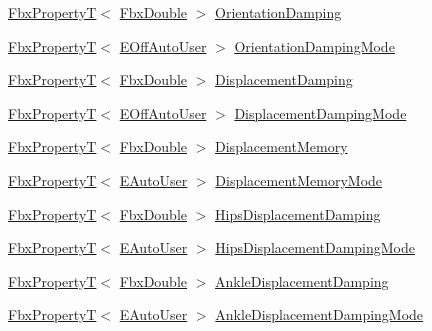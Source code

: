 \begin{DoxyCompactItemize}
\item 
\hyperlink{class_fbx_property_t}{Fbx\+PropertyT}$<$ \hyperlink{fbxtypes_8h_a171e72a1c46fc15c1a6c9c31948c1c5b}{Fbx\+Double} $>$ \hyperlink{class_fbx_character_a2be5002d31cb53a01155bf2d1306165d}{Orientation\+Damping}
\item 
\hyperlink{class_fbx_property_t}{Fbx\+PropertyT}$<$ \hyperlink{class_fbx_character_ab698a180e6f900ba8317257749c2ecce}{E\+Off\+Auto\+User} $>$ \hyperlink{class_fbx_character_a6de028b57c5ab1cd224306c2ee65d825}{Orientation\+Damping\+Mode}
\item 
\hyperlink{class_fbx_property_t}{Fbx\+PropertyT}$<$ \hyperlink{fbxtypes_8h_a171e72a1c46fc15c1a6c9c31948c1c5b}{Fbx\+Double} $>$ \hyperlink{class_fbx_character_a356196523e3cf619bedb4c6cecd7f94c}{Displacement\+Damping}
\item 
\hyperlink{class_fbx_property_t}{Fbx\+PropertyT}$<$ \hyperlink{class_fbx_character_ab698a180e6f900ba8317257749c2ecce}{E\+Off\+Auto\+User} $>$ \hyperlink{class_fbx_character_a52f89eade66ff10d523f56b2b6a9ca01}{Displacement\+Damping\+Mode}
\item 
\hyperlink{class_fbx_property_t}{Fbx\+PropertyT}$<$ \hyperlink{fbxtypes_8h_a171e72a1c46fc15c1a6c9c31948c1c5b}{Fbx\+Double} $>$ \hyperlink{class_fbx_character_a660e7aa3be757e6f1309cf95bde539d7}{Displacement\+Memory}
\item 
\hyperlink{class_fbx_property_t}{Fbx\+PropertyT}$<$ \hyperlink{class_fbx_character_a5b03462709a82a15d89ee4563a4c49df}{E\+Auto\+User} $>$ \hyperlink{class_fbx_character_a73c80aa7582bf31b0b87fa1a138a82c0}{Displacement\+Memory\+Mode}
\item 
\hyperlink{class_fbx_property_t}{Fbx\+PropertyT}$<$ \hyperlink{fbxtypes_8h_a171e72a1c46fc15c1a6c9c31948c1c5b}{Fbx\+Double} $>$ \hyperlink{class_fbx_character_a47179bbdfc97e82fba27844fe2e379a3}{Hips\+Displacement\+Damping}
\item 
\hyperlink{class_fbx_property_t}{Fbx\+PropertyT}$<$ \hyperlink{class_fbx_character_a5b03462709a82a15d89ee4563a4c49df}{E\+Auto\+User} $>$ \hyperlink{class_fbx_character_ae322e9c6be19ec69fa236846625ec791}{Hips\+Displacement\+Damping\+Mode}
\item 
\hyperlink{class_fbx_property_t}{Fbx\+PropertyT}$<$ \hyperlink{fbxtypes_8h_a171e72a1c46fc15c1a6c9c31948c1c5b}{Fbx\+Double} $>$ \hyperlink{class_fbx_character_ac8b28589ae3323eb9fed84017d421996}{Ankle\+Displacement\+Damping}
\item 
\hyperlink{class_fbx_property_t}{Fbx\+PropertyT}$<$ \hyperlink{class_fbx_character_a5b03462709a82a15d89ee4563a4c49df}{E\+Auto\+User} $>$ \hyperlink{class_fbx_character_ac0a3cd5def63f2246ee0b8ad4226c008}{Ankle\+Displacement\+Damping\+Mode}

\end{DoxyCompactItemize}

